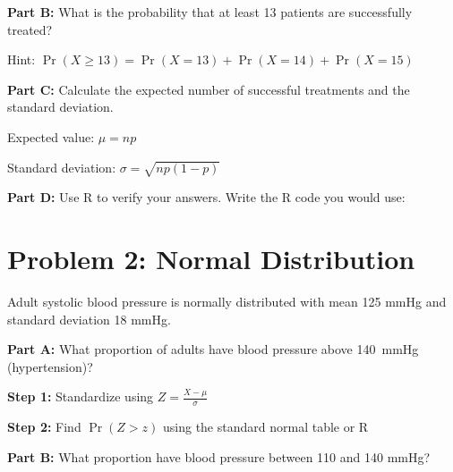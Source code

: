 \documentclass[11pt]{article}
\begin{document}
\textbf{Part B:} What is the probability that at least 13 patients are successfully treated?

\vspace{0.3cm}

Hint: $\Pr(X \geq 13) = \Pr(X=13) + \Pr(X=14) + \Pr(X=15)$

\vspace{3.5cm}

\textbf{Part C:} Calculate the expected number of successful treatments and the standard deviation.

\vspace{0.3cm}

Expected value: $\mu = np$

\vspace{1cm}

Standard deviation: $\sigma = \sqrt{np(1-p)}$

\vspace{1.5cm}

\textbf{Part D:} Use R to verify your answers. Write the R code you would use:

\vspace{2.5cm}

\newpage

\section{Problem 2: Normal Distribution}

Adult systolic blood pressure is normally distributed with mean 125 mmHg and standard deviation 18 mmHg.

\vspace{6pt}

\textbf{Part A:} What proportion of adults have blood pressure above 140~mmHg (hypertension)?

\vspace{0.3cm}

\textbf{Step 1:} Standardize using $Z = \frac{X - \mu}{\sigma}$

\vspace{2cm}

\textbf{Step 2:} Find $\Pr(Z > z)$ using the standard normal table or R

\vspace{2cm}

\textbf{Part B:} What proportion have blood pressure between 110 and 140 mmHg?

\vspace{0.3cm}
\end{document}
